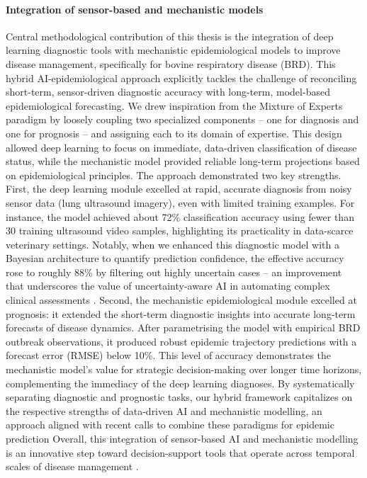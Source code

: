 \paragraph{Integration of sensor-based and mechanistic models} Central methodological contribution of this thesis is the integration of deep learning diagnostic tools with mechanistic epidemiological models to improve disease management, specifically for bovine respiratory disease (BRD). This hybrid AI-epidemiological approach explicitly tackles the challenge of reconciling short-term, sensor-driven diagnostic accuracy with long-term, model-based epidemiological forecasting. We drew inspiration from the Mixture of Experts paradigm by loosely coupling two specialized components – one for diagnosis and one for prognosis – and assigning each to its domain of expertise. This design allowed deep learning to focus on immediate, data-driven classification of disease status, while the mechanistic model provided reliable long-term projections based on epidemiological principles. The approach demonstrated two key strengths. First, the deep learning module excelled at rapid, accurate diagnosis from noisy sensor data (lung ultrasound imagery), even with limited training examples. For instance, the model achieved about 72\% classification accuracy using fewer than 30 training ultrasound video samples, highlighting its practicality in data-scarce veterinary settings. Notably, when we enhanced this diagnostic model with a Bayesian architecture to quantify prediction confidence, the effective accuracy rose to roughly 88\% by filtering out highly uncertain cases – an improvement that underscores the value of uncertainty-aware AI in automating complex clinical assessments \cite{gal2016dropout}
. Second, the mechanistic epidemiological module excelled at prognosis: it extended the short-term diagnostic insights into accurate long-term forecasts of disease dynamics. After parametrising the model with empirical BRD outbreak observations, it produced robust epidemic trajectory predictions with a forecast error (RMSE) below 10\%. This level of accuracy demonstrates the mechanistic model’s value for strategic decision-making over longer time horizons, complementing the immediacy of the deep learning diagnoses. By systematically separating diagnostic and prognostic tasks, our hybrid framework capitalizes on the respective strengths of data-driven AI and mechanistic modelling, an approach aligned with recent calls to combine these paradigms for epidemic prediction Overall, this integration of sensor-based AI and mechanistic modelling is an innovative step toward decision-support tools that operate across temporal scales of disease management \cite{chen2024hybrid}.



